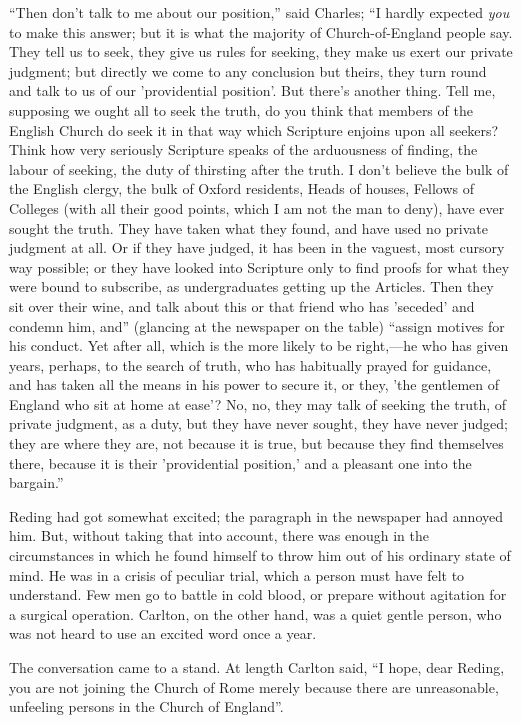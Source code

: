 ``Then don't talk to me about our position,'' said Charles;
``I hardly expected \emph{you} to make this answer; but it is what
the majority of Church-of-England people say. They tell us to seek,
they give us rules for seeking, they make us exert our private
judgment; but directly we come to any conclusion but theirs, they turn
round and talk to us of our 'providential position'. But there's
another thing. Tell me, supposing we ought all to seek the truth, do
you think that members of the English Church do seek it in that way
which Scripture enjoins upon all seekers? Think how very seriously
Scripture speaks of the arduousness of finding, the labour of seeking,
the duty of thirsting after the truth. I don't believe the bulk of the
English clergy, the bulk of Oxford residents, Heads of houses, Fellows
of Colleges (with all their good points, which I am not the man to
deny), have ever sought the truth. They have taken what they found,
and have used no private judgment at all. Or if they have judged, it
has been in the vaguest, most cursory way possible; or they have looked into Scripture only to find proofs for what they were bound to
subscribe, as undergraduates getting up the Articles. Then they sit
over their wine, and talk about this or that friend who has 'seceded'
and condemn him, and'' (glancing at the newspaper on the table)
``assign motives for his conduct. Yet after all, which is the more
likely to be right,—he who has given years, perhaps, to the search
of truth, who has habitually prayed for guidance, and has taken all
the means in his power to secure it, or they, 'the gentlemen of
England who sit at home at ease'? No, no, they may talk of seeking the
truth, of private judgment, as a duty, but they have never sought,
they have never judged; they are where they are, not because it is
true, but because they find themselves there, because it is their
'providential position,' and a pleasant one into the bargain.''

Reding had got somewhat excited; the paragraph in the newspaper had
annoyed him. But, without taking that into account, there was enough
in the circumstances in which he found himself to throw him out of his
ordinary state of mind. He was in a crisis of peculiar trial, which a
person must have felt to understand. Few men go to battle in cold
blood, or prepare without agitation for a surgical operation. Carlton,
on the other hand, was a quiet gentle person, who was not heard to use
an excited word once a year.

The conversation came to a stand. At length Carlton said, ``I
hope, dear Reding, you are not joining the Church of Rome merely
because there are unreasonable, unfeeling persons in the Church of
England''.

